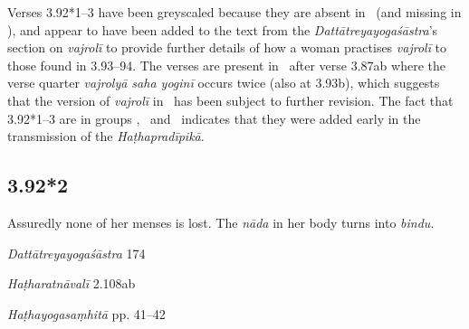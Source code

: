 \begin{ekdosis}
\begin{philcomm}[hp03_092_1]
Verses 3.92*1–3 have been greyscaled because they are absent in \alphaThree \ (and missing in  \alphaOne), and appear to have been added to the text from the \emph{Dattātreyayogaśāstra}'s section on \emph{vajrolī} to provide further details of how a woman practises \emph{vajrolī} to those found in 3.93–94. The verses are present in \alphaTwo\ after verse 3.87ab where the verse quarter \emph{vajrolyā saha yoginī} occurs twice (also at 3.93b), which suggests that the version of \emph{vajrolī} in \alphaTwo\ has been subject to further revision. The fact that 3.92*1–3 are in groups \textbeta, \textgamma\ and \texteta\ indicates that they were added early in the transmission of the \emph{Haṭhapradīpikā}.     
\end{philcomm}

\subsection*{3.92*2}
\begin{translation}[hp03_092_2]
Assuredly none of her menses is lost. The \emph{nāda} in her body turns into \emph{bindu}.
\end{translation}

\begin{sources}[hp03_092_2]
\emph{Dattātreyayogaśāstra} 174
\begin{versinnote}
\end{versinnote}
\end{sources}

\begin{testimonia}[hp03_092_2]
\emph{Haṭharatnāvalī} 2.108ab
\begin{versinnote}
\end{versinnote}

\emph{Haṭhayogasaṃhitā} pp. 41--42
\begin{versinnote}
\end{versinnote}
\end{testimonia}


\end{ekdosis}
